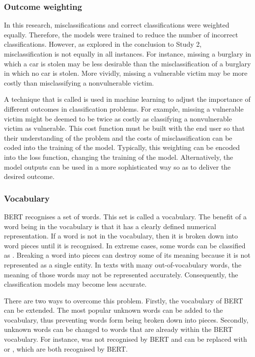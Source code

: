 \subsubsection{Outcome weighting} In this research, misclassifications and correct classifications were weighted equally. Therefore, the models were trained to reduce the number of incorrect classifications. However, as explored in the conclusion to Study 2, misclassification is not equally in all instances. For instance, missing a burglary in which a car is stolen may be less desirable than the misclassification of a burglary in which no car is stolen. More vividly, missing a vulnerable victim may be more costly than misclassifying a nonvulnerable victim.

A technique that is called  is used in machine learning to adjust the importance of different outcomes in classification problems. For example, missing a vulnerable victim might be deemed to be twice as costly as classifying a nonvulnerable victim as vulnerable. This cost function must be built with the end user so that their understanding of the problem and the costs of misclassification can be coded into the training of the model. Typically, this weighting can be encoded into the loss function, changing the training of the model. Alternatively, the model outputs can be used in a more sophisticated way so as to deliver the desired outcome.



\subsubsection{Vocabulary} BERT recognises a set of words. This set is called a vocabulary. The benefit of a word being in the vocabulary is that it has a clearly defined numerical representation. If a word is not in the vocabulary, then it is broken down into word pieces until it is recognised. In extreme cases, some words can be classified as . Breaking a word into pieces can destroy some of its meaning because it is not represented as a single entity. In texts with many out-of-vocabulary words, the meaning of those words may not be represented accurately. Consequently, the classification models may become less accurate.

There are two ways to overcome this problem. Firstly, the vocabulary of BERT can be extended. The most popular unknown words can be added to the vocabulary, thus preventing words form being broken down into pieces. Secondly, unknown words can be changed to words that are already within the BERT vocabulary. For instance,  was not recognised by BERT and can be replaced with  or , which are both recognised by BERT.

